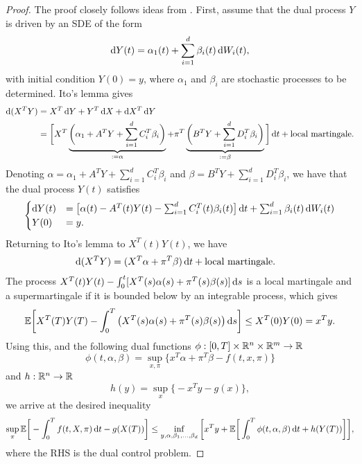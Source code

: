 \begin{proof}
The proof closely follows ideas from \cite{Constrained_Quadratic_Risk_Minimisation_Via_FBSDEs}. First, assume that the dual process $Y$ is driven by an SDE of the form
\begin{equation*}
    \mathop{}\!\mathrm{d} Y(t) = \alpha_1 (t) + \sum_{i=1}^d \beta_i(t) \mathop{}\!\mathrm{d} W_i(t),
\end{equation*}
with initial condition $Y(0) = y$, where $\alpha_1$ and $\beta_i$ are stochastic processes to be determined. Ito's lemma gives 
\begin{align*}
    \mathop{}\!\mathrm{d} (X^T Y) &= X^T \mathop{}\!\mathrm{d} Y + Y^T \mathop{}\!\mathrm{d} X + \mathop{}\!\mathrm{d} X^T \mathop{}\!\mathrm{d} Y\\
    &= \bigg[  X^T \underbrace{\bigg(\alpha_1 + A^T Y + \sum_{i=1}^d C_i^T \beta_i\bigg)}_{:= \alpha} + \pi^T \underbrace{\bigg(B^T Y + \sum_{i=1}^d D_i^T \beta_i\bigg)}_{:= \beta} \bigg] \mathop{}\!\mathrm{d} t + \text{local martingale}.
\end{align*}
Denoting $\alpha = \alpha_1 + A^T Y + \sum_{i=1}^d C_i^T \beta_i$ and $\beta = B^T Y + \sum_{i=1}^d D_i^T \beta_i$, we have that the dual process $Y(t)$ satisfies
\begin{equation}
    \begin{cases}
        \mathop{}\!\mathrm{d} Y(t) &= \big[ \alpha(t) - A^T(t) Y(t) - \sum_{i=1}^d C_i^T(t) \beta_i(t)\big]\mathop{}\!\mathrm{d} t + \sum_{i=1}^d \beta_i(t) \mathop{}\!\mathrm{d} W_i(t)\\
        Y(0) &= y. \label{eq: y_sde}
    \end{cases}
\end{equation}
Returning to Ito's lemma to $X^T(t) Y(t)$, we have
\begin{align*}
    \mathop{}\!\mathrm{d} (X^T Y) &= (X^T \alpha + \pi^T \beta ) \mathop{}\!\mathrm{d} t + \text{local martingale}.
\end{align*}
The process $X^T(t)Y(t) - \int_{0}^t [X^T(s) \alpha(s) + \pi^T(s) \beta(s)] \mathop{}\!\mathrm{d} s$ is a local martingale and a supermartingale if it is bounded below by an integrable process, which gives 
\begin{equation}
    \mathbb{E} \bigg[ X^T(T) Y(T) - \int_{0}^T \big(X^T(s) \alpha(s) + \pi^T(s) \beta(s) \big) \mathop{}\!\mathrm{d} s \bigg] \le X^T(0) Y(0) =  x^T y.
\end{equation}
Using this, and the following dual functions $\phi : [0, T] \times \mathbb{R}^n \times \mathbb{R}^m \to \mathbb{R}$ 
\begin{equation}
    \phi(t, \alpha, \beta) = \sup_{x, \pi} \big\{x^T \alpha + \pi^T \beta - f(t, x, \pi) \big\} \label{eq: phi_def}
\end{equation}
and $h: \mathbb{R}^n \to \mathbb{R}$
\begin{equation}
    h(y) = \sup_x \big\{-x^T y - g(x)\big\}, \label{eq: h_def}
\end{equation}
we arrive at the desired inequality
\begin{equation}
    \sup_\pi \mathbb{E} \bigg[ -\int_{0}^T f(t, X,\pi) \mathop{}\!\mathrm{d} t - g(X(T)) \bigg] \le \inf_{y, \alpha, \beta_1, \dots, \beta_d} \bigg[ x^T y + \mathbb{E}\bigg[\int_{0}^T \phi(t,\alpha, \beta ) \mathop{}\!\mathrm{d} t + h(Y(T)) \bigg] \bigg],
\end{equation}
where the RHS is the dual control problem. 


\end{proof}
